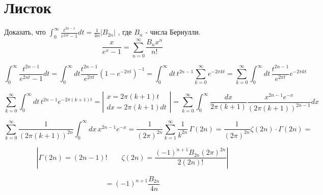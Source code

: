 \section{Листок}

\begin{exercise}
Доказать, что 	$\displaystyle\int_{0}^{\infty} \frac{t^{2 n-1}}{e^{2 \pi t}-1} d t=\frac{1}{4 n}\left| B_{2 n}\right| $ , где $B_{n}$ - числа Бернулли.
$$ \displaystyle \frac{x}{e^{x}-1}=\sum_{n=0}^{\infty} \frac{B_{n} x^{n}}{n !}$$

\end{exercise}
\begin{solution}
	$$
	\int_{0}^{\infty} \frac{t^{2 n-1}}{e^{2 n t}-1} d t=\int_{0}^{\infty} d t \frac{t^{2 n-1}}{e^{2 \pi t}}\left(1-e^{-2 \pi t}\right)^{-1} = \int_{0}^{\infty}  d t \hspace{2pt} t^{2 n-1} \sum_{k=0}^{\infty} e^{-2 \pi k t}=\sum_{k = 0}^{\infty} \int_{0}^{\infty} d t \hspace{2pt} \frac{t^{2 n-1}}{e^{2 \pi t}} e^{-2 \pi k t}
	$$
	
	$$
	\sum_{k=0}^{\infty} \int_{0}^{\infty} d t \hspace{2pt} t^{2 n-1} e^{-2 \pi(k+1) t} = \left|
	\begin{array}{l}{x=2 \pi(k+1) t} \\ {d x=2 \pi(k+1) d t}\end{array} \right|=\sum_{k=0}^{\infty} \int_{0}^{\infty} \frac{d x}{2 \pi(k+1)} \frac{x^{2 n-1} e^{-x}}{(2 \pi(k+1))^{2 n-1}} d x
	$$
	
	$$
	\sum_{k=0}^{\infty} \frac{1}{(2 \pi(k+1))^{2 n}} \int_{0}^{\infty} d x \hspace{2pt} x^{2 n-1} e^{-x} = \frac{1}{(2 \pi)^{2n}}\sum_{k=1}^{\infty} \frac{1}{k^{2 n}} \hspace{2pt} \Gamma(2 n) = \frac{1}{(2 \pi)^{2 n}} \zeta(2 n) \cdot \Gamma(2 n) = 
	$$
	
	$$
	\left|\Gamma(2n)=(2 n-1) ! \qquad \zeta(2 n)=\frac{(-1)^{n+1} B_{2 n}(2 \pi)^{2 n}}{2(2 n) !} \right|
	$$
	
	$$
	= (-1)^{n+1} \frac{B_{2 n}}{4 n}
	$$
	
\end{solution}